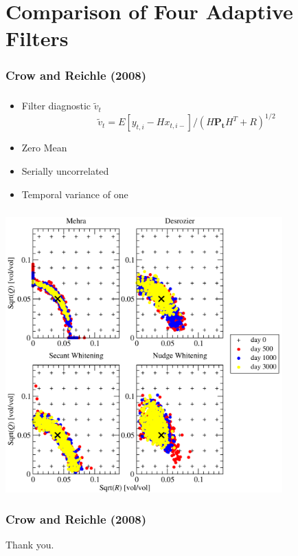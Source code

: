 \documentclass[mathserif]{beamer}
\begin{document}
\section{Comparison of Four Adaptive Filters}

\begin{frame}
  \frametitle{Crow and Reichle (2008)}
  \tableofcontents[currentsection]
\end{frame}

\begin{frame}
  \frametitle{\insertsection}
  \begin{itemize}
    \item Filter diagnostic $\tilde{v}_t$
    \begin{equation} \tilde{v}_t = E \left[ y_{t,i}-Hx_{t,i-} \right]/(H\mathbf{P_t}H^T+R)^{1/2}\end{equation}
    \item Zero Mean
    \item Serially uncorrelated
    \item Temporal variance of one
  \end{itemize}
\end{frame}

\begin{frame}
  \begin{center}
  \frametitle{\insertsection}
  \includegraphics[width=0.8\textwidth]{days}
  \end{center}
\end{frame}

\begin{frame}
  \frametitle{Crow and Reichle (2008)}
\begin{centering}
  Thank you.
\end{centering}
\end{frame}



\end{document}
